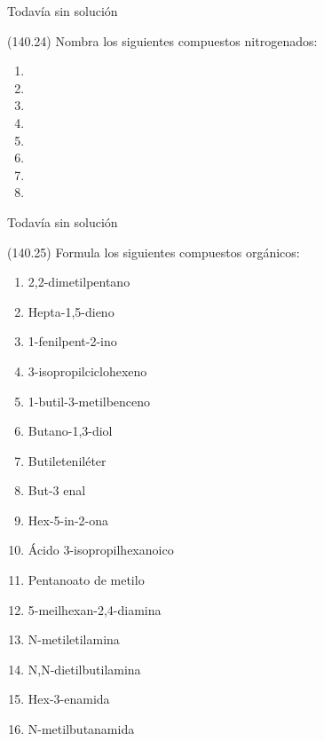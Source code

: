   \begin{solution}[print=false]
    Todavía sin solución
  \end{solution}




  \begin{exercise}[
      tags    = {},
      topics  = {química, química orgánica, orgánica},
      source  = {FQ 1B MGH 2016, p140, e24},
    ]
    (140.24) Nombra los siguientes compuestos nitrogenados:
    \begin{enumerate}
      \item {}
      \item {}
      \item {}
      \item {}
      \item {}
      \item {}
      \item {}
      \item {}
    \end{enumerate}
  \end{exercise}

  \begin{solution}[print=false]
    Todavía sin solución
  \end{solution}




  \begin{exercise}[
      tags    = {},
      topics  = {química, química orgánica, orgánica},
      source  = {FQ 1B MGH 2016, p140, e25},
    ]
    (140.25) Formula los siguientes compuestos orgánicos:
    \begin{enumerate}
      \item 2,2-dimetilpentano
      \item Hepta-1,5-dieno
      \item 1-fenilpent-2-ino
      \item 3-isopropilciclohexeno
      \item 1-butil-3-metilbenceno
      \item Butano-1,3-diol
      \item Butileteniléter
      \item But-3 enal
      \item Hex-5-in-2-ona
      \item Ácido 3-isopropilhexanoico
      \item Pentanoato de metilo
      \item 5-meilhexan-2,4-diamina
      \item N-metiletilamina
      \item N,N-dietilbutilamina
      \item Hex-3-enamida
      \item N-metilbutanamida
    \end{enumerate}
  \end{exercise}

